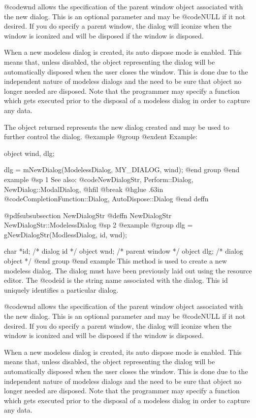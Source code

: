 @code{wnd} allows the specification of the parent window object associated
with the new dialog.  This is an optional parameter and may be @code{NULL}
if it not desired.  If you do specify a parent window, the dialog will
iconize when the window is iconized and will be disposed if the window
is disposed.

When a new modeless dialog is created, its auto dispose mode is enabled.
This means that, unless disabled, the object representing the dialog
will be automatically disposed when the user closes the window.  This
is done due to the independent nature of modeless dialogs and the need
to be sure that object no longer needed are disposed.  Note that the
programmer may specify a function which gets executed prior to the
disposal of a modeless dialog in order to capture any data.

The object returned represents the new dialog created and may be
used to further control the dialog.
@example
@group
@exdent Example:

object  wind, dlg;

dlg = mNewDialog(ModelessDialog, MY_DIALOG, wind);
@end group
@end example
@sp 1
See also:  @code{NewDialogStr, Perform::Dialog, NewDialog::ModalDialog,}
@hfil @break @hglue .63in @code{CompletionFunction::Dialog, AutoDispose::Dialog}
@end deffn












@pdfsubsubsection {NewDialogStr}
@deffn {NewDialogStr} NewDialogStr::ModelessDialog
@sp 2
@example
@group
dlg = gNewDialogStr(ModlessDialog, id, wnd);

char      *id;  /*  dialog id      */
object    wnd;  /*  parent window  */
object    dlg;  /*  dialog object  */
@end group
@end example
This method is used to create a new modeless dialog.  The dialog must have
been previously laid out using the resource editor.  The @code{id} is
the string name associated with the dialog.  This id uniquely identifies
a particular dialog.

@code{wnd} allows the specification of the parent window object associated
with the new dialog.  This is an optional parameter and may be @code{NULL}
if it not desired.  If you do specify a parent window, the dialog will
iconize when the window is iconized and will be disposed if the window
is disposed.

When a new modeless dialog is created, its auto dispose mode is enabled.
This means that, unless disabled, the object representing the dialog
will be automatically disposed when the user closes the window.  This
is done due to the independent nature of modeless dialogs and the need
to be sure that object no longer needed are disposed.  Note that the
programmer may specify a function which gets executed prior to the
disposal of a modeless dialog in order to capture any data.

